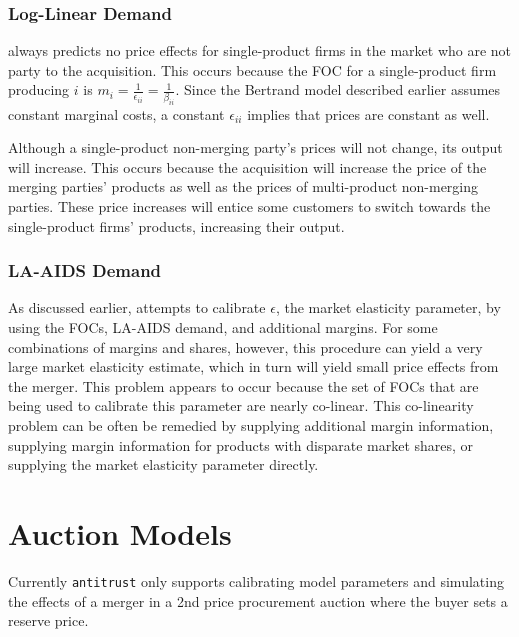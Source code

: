 \documentclass[11pt,numbers=noenddot,pointlessnumbers]{scrreprt}
\newcommand{\atr}{{\tt antitrust}}
\numberwithin{equation}{section}
\begin{document}
\subsection{Log-Linear Demand}
 \verb@loglinear@ always predicts no price effects for single-product
 firms in the market who are not party to the acquisition. This
 occurs because the FOC for a single-product firm producing $i$ is
 $m_i=\frac{1}{\epsilon_{ii}}=\frac{1}{\beta_{ii}}$. Since the Bertrand model described earlier
 assumes constant marginal costs, a constant $\epsilon_{ii}$  implies that prices are
 constant as well.

 Although a single-product non-merging party's prices will not
 change, its output will increase. This occurs because the
 acquisition will increase the price of the merging parties' products
 as well as the prices of multi-product non-merging parties. These
 price increases will entice some customers to switch towards the
 single-product firms' products, increasing their output.

\subsection{LA-AIDS Demand}
As discussed earlier, \verb@aids@ attempts to calibrate $\epsilon$, the
market elasticity parameter, by using the FOCs, LA-AIDS demand, and
additional margins. For some combinations of margins and shares,
however, this procedure can yield a very large market elasticity estimate, which
in turn will yield small price effects from the merger. This problem
appears to occur because the set of FOCs that are being used to
calibrate this parameter are nearly co-linear. This co-linearity problem
can be often be remedied by supplying additional margin
information, supplying margin information for products with
disparate market shares, or supplying the market elasticity parameter directly.

\chapter{Auction Models}
Currently \atr{} only supports calibrating model parameters and simulating the effects of a merger in a
2nd price procurement auction where the buyer sets a reserve price.
\end{document}
